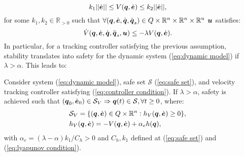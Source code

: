 \begin{equation} \label{eq:lyapunov condition}
    k_1 || \dot{\boldsymbol{e}}|| \leq V({\boldsymbol{q}}, \dot{\boldsymbol{e}}) \leq k_2 || \dot{\boldsymbol{e}}||,
\end{equation}
for some $k_1,k_2\in \mathbb{R}_{>0}$ such that $\forall({\boldsymbol{q}},\dot{\boldsymbol{e}},\dot{{\boldsymbol{q}}},\ddot{{\boldsymbol{q}}}_s)\in Q \times \mathbb{R}^n \times \mathbb{R}^n \times \mathbb{R}^n$ $\boldsymbol{u}$ satisfies:
\begin{equation} \label{eq:controller condition}
    \dot{V}({\boldsymbol{q}},\dot{\boldsymbol{e}},\dot{{\boldsymbol{q}}},\ddot{{\boldsymbol{q}}}_s,\boldsymbol{u}) \leq -\lambda V({\boldsymbol{q}},\dot{\boldsymbol{e}}).
\end{equation}
In particular, for a tracking controller satisfying the previous assumption, stability translates into safety for the dynamic system (\ref{eq:dynamic model}) if $\lambda > \alpha$. This leads to:
\begin{theorem}\label{th:alpha limit}
    Consider system (\ref{eq:dynamic model}), safe set $\mathcal{S}$ (\ref{eq:safe set}), and velocity tracking controller satisfying (\ref{eq:controller condition}). If $\lambda > \alpha$, safety is achieved such that $({\boldsymbol{q}}_0,\dot{\boldsymbol{e}}_0)\in \mathcal{S}_V \Rightarrow {\boldsymbol{q}}(t) \in \mathcal{S}, \forall t\geq 0$, where:
    \begin{align}
        &\mathcal{S}_V = \{ ({\boldsymbol{q}},\dot{\boldsymbol{e}})\in Q \times \mathbb{R}^n: h_V({\boldsymbol{q}},\dot{\boldsymbol{e}})\geq 0 \},\\
        &h_V({\boldsymbol{q}},\dot{\boldsymbol{e}}) = -V({\boldsymbol{q}},\dot{\boldsymbol{e}})+ \alpha_e h({\boldsymbol{q}}), \label{eq:h_V}
    \end{align}
    with $\alpha_e = (\lambda - \alpha)k_1/C_h > 0$ and $C_h,k_1$ defined at (\ref{eq:safe set}) and (\ref{eq:lyapunov condition}).
\end{theorem}

